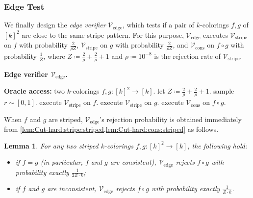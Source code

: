 \documentclass[11pt,fleqn]{article}
\renewcommand{\leq}{\leqslant}
\newcommand{\defeq}{\coloneq}
\newcommand{\V}{\calV}
\newcommand{\f}{f}
\newcommand{\g}{g}
\newcommand{\rhozero}{10^{-8}}
\newcommand{\Vstripe}{\V_\mathrm{stripe}}
\newcommand{\Vcons}{\V_\mathrm{cons}}
\newcommand{\Vedge}{\V_\mathrm{edge}}
\newcommand{\calV}{\mathcal{V}}
\newtheorem{lemma}[theorem]{Lemma}
\theoremstyle{definition}
\numberwithin{equation}{section}
\begin{document}
\subsubsection{Edge Test}
\label{sec:Cut-hard:tests:edge}


We finally design the \emph{edge verifier} $\Vedge$,
which tests if a pair of $k$-colorings $\f,\g$ of $[k]^2$ are 
close to the same stripe pattern.
For this purpose, $\Vedge$ executes
$\Vstripe$ on $\f$ with probability $\frac{2}{\rho Z}$,
$\Vstripe$ on $\g$ with probability $\frac{2}{\rho Z}$, and
$\Vcons$ on $\f \circ \g$ with probability $\frac{1}{Z}$, where
$Z \defeq \frac{2}{\rho} + \frac{2}{\rho} + 1$ and
$\rho \defeq \rhozero$ is the rejection rate of $\Vstripe$.


\begin{itembox}[l]{\textbf{Edge verifier $\Vedge$.}}
\begin{algorithmic}[1]
    \item[\textbf{Oracle access:}]
        two $k$-colorings $\f,\g \colon [k]^2 \to [k]$.
    \State let $Z \defeq \frac{2}{\rho} + \frac{2}{\rho} + 1$.
    \State sample $r \sim [0,1]$.
    \If{$0 \leq r < \frac{2}{\rho Z}$} 
        \State execute $\Vstripe$ on $\f$.
    \ElsIf{$\frac{2}{\rho Z} \leq r < \frac{2}{\rho Z} + \frac{2}{\rho Z}$} 
        \State execute $\Vstripe$ on $\g$.
    \Else {}
        \State execute $\Vcons$ on $\f \circ \g$.
    \EndIf
\end{algorithmic}
\end{itembox}


When $\f$ and $\g$ are striped,
$\Vedge$'s rejection probability is obtained immediately 
from \cref{lem:Cut-hard:stripe:striped,lem:Cut-hard:cons:striped} as follows.
\begin{lemma}
\label{lem:Cut-hard:edge:striped}
For any two striped $k$-colorings $\f,\g \colon [k]^2 \to [k]$,
the following hold\textup{:}
\begin{itemize}
    \item if $\f = \g$ (in particular, $\f$ and $\g$ are consistent),
        $\Vedge$ rejects $\f \circ \g$ with probability exactly $\frac{1}{2Z \cdot k}$\textup{;}
    \item if $\f$ and $\g$ are inconsistent,
        $\Vedge$ rejects $\f \circ \g$ with probability exactly $\frac{1}{Z \cdot k}$.
\end{itemize}
\end{lemma}
\end{document}
